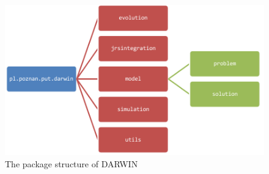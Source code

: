 \begin{figure}
  \centering \includegraphics[scale=0.9]{img/packages}
  \caption{The package structure of DARWIN}
  \label{packages}
\end{figure}

